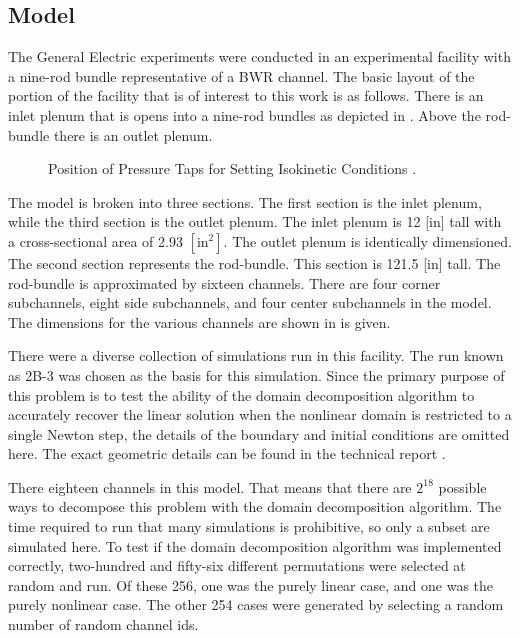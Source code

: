 \subsection{Model}
\label{sect:complexModel}

The General Electric experiments were conducted in an experimental facility with a nine-rod bundle representative of a BWR channel.
The basic layout of the portion of the facility that is of interest to this work is as follows.
There is an inlet plenum that is opens into a nine-rod bundles as depicted in .
Above the rod-bundle there is an outlet plenum.

\begin{figure}[ht]
\centering

\caption{Position of Pressure Taps for Setting Isokinetic Conditions \cite{Lahey1970}.}
\label{fig:channel_layout}
\end{figure}

The \cobra{} model is broken into three sections.
The first section is the inlet plenum, while the third section is the outlet plenum.
The inlet plenum is 12 [in] tall with a cross-sectional area of 2.93 $[ \text{in}^2]$.
The outlet plenum is identically dimensioned.
The second section represents the rod-bundle.
This section is 121.5 [in] tall.
The rod-bundle is approximated by sixteen channels.
There are four corner subchannels, eight side subchannels, and four center subchannels in the model.
The dimensions for the various channels are shown in  is given.

There were a diverse collection of simulations run in this facility.
The run known as 2B-3 was chosen as the basis for this simulation.
Since the primary purpose of this problem is to test the ability of the domain decomposition algorithm to accurately recover the linear solution when the nonlinear domain is restricted to a single Newton step, the details of the boundary and initial conditions are omitted here.
The exact geometric details can be found in the technical report \cite{Lahey1970}.

There eighteen channels in this model.
That means that there are $2^{18}$ possible ways to decompose this problem with the domain decomposition algorithm.
The time required to run that many simulations is prohibitive, so only a subset are simulated here.
To test if the domain decomposition algorithm was implemented correctly, two-hundred and fifty-six different permutations were selected at random and run.
Of these 256, one was the purely linear case, and one was the purely nonlinear case.
The other 254 cases were generated by selecting a random number of random channel ids.

